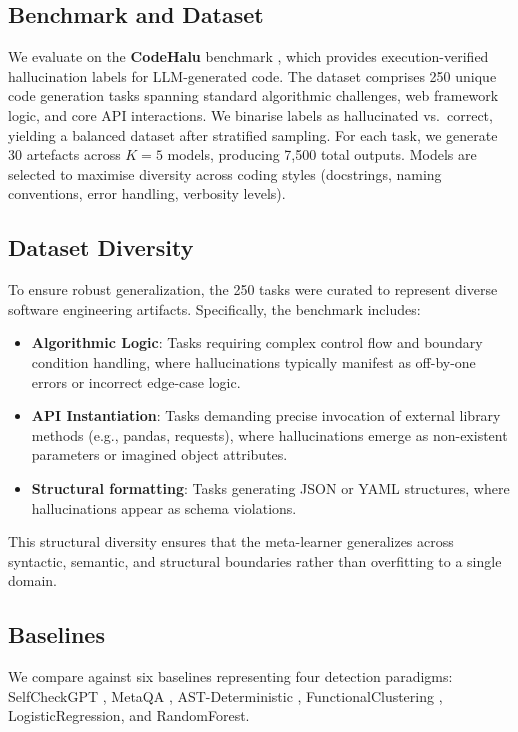 \documentclass{svproc}
\begin{document}
\subsection{Benchmark and Dataset}\label{sec:dataset}
We evaluate on the \textbf{CodeHalu} benchmark \cite{tian2025codehalu}, which provides execution-verified hallucination labels for LLM-generated code. The dataset comprises 250 unique code generation tasks spanning standard algorithmic challenges, web framework logic, and core API interactions. We binarise labels as hallucinated vs.\ correct, yielding a balanced dataset after stratified sampling.
For each task, we generate 30 artefacts across $K=5$ models, producing 7,500 total outputs. Models are selected to maximise diversity across coding styles (docstrings, naming conventions, error handling, verbosity levels).

\subsection{Dataset Diversity}
To ensure robust generalization, the 250 tasks were curated to represent diverse software engineering artifacts. Specifically, the benchmark includes:
\begin{itemize}
    \item \textbf{Algorithmic Logic}: Tasks requiring complex control flow and boundary condition handling, where hallucinations typically manifest as off-by-one errors or incorrect edge-case logic.
    \item \textbf{API Instantiation}: Tasks demanding precise invocation of external library methods (e.g., pandas, requests), where hallucinations emerge as non-existent parameters or imagined object attributes.
    \item \textbf{Structural formatting}: Tasks generating JSON or YAML structures, where hallucinations appear as schema violations.
\end{itemize}
This structural diversity ensures that the meta-learner generalizes across syntactic, semantic, and structural boundaries rather than overfitting to a single domain.

\subsection{Baselines}\label{sec:baselines}
We compare against six baselines representing four detection paradigms: SelfCheckGPT \cite{manakul2023selfcheckgpt}, MetaQA \cite{yang2025metaqa}, AST-Deterministic \cite{khati2026ast}, FunctionalClustering \cite{ravuri2025clustering}, LogisticRegression, and RandomForest.
\end{document}
